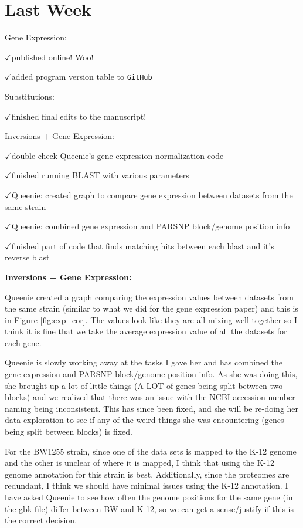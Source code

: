 \documentclass[12pt]{article}
\newcommand{\ch}{$\checkmark$}
\begin{document}

	
\section*{Last Week}

Gene Expression:

\ch published online! Woo!

\ch added program version table to \texttt{GitHub}


Substitutions:

\ch finished final edits to the manuscript!

Inversions $+$ Gene Expression:

\ch double check Queenie's gene expression normalization code

\ch finished running BLAST with various parameters

\ch Queenie: created graph to compare gene expression between datasets from the same strain

\ch Queenie: combined gene expression and PARSNP block/genome position info

\ch finished part of code that finds matching hits between each blast and it's reverse blast


\textbf{Inversions + Gene Expression:}

Queenie created a graph comparing the expression values between datasets from the same strain (similar to what we did for the gene expression paper) and this is in Figure \ref{fig:exp_cor}.
The values look like they are all mixing well together so I think it is fine that we take the average expression value of all the datasets for each gene.


Queenie is slowly working away at the tasks I gave her and has combined the gene expression and PARSNP block/genome position info.
As she was doing this, she brought up a lot of little things (A LOT of genes being split between two blocks) and we realized that there was an issue with the NCBI accession number naming being inconsistent.
This has since been fixed, and she will be re-doing her data exploration to see if any of the weird things she was encountering (genes being split between blocks) is fixed.

For the BW1255 strain, since one of the data sets is mapped to the K-12 genome and the other is unclear of where it is mapped, I think that using the K-12 genome annotation for this strain is best.
Additionally, since the proteomes are redundant, I think we should have minimal issues using the K-12 annotation.
I have asked Queenie to see how often the genome positions for the same gene (in the gbk file) differ between BW and K-12, so we can get a sense/justify if this is the correct decision.
\end{document}
